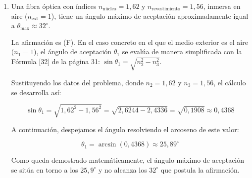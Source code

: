 \documentclass[11pt, a4paper]{article}
\newenvironment{problem}[1][Cuestión]{
	\vspace{0.5cm}
	\noindent{\Large\bfseries #1} \par\vspace{0.5cm}
}{
	\vspace{0.5cm}
}
\begin{document}
\begin{problem}[Cuestión 3]
\begin{enumerate}[label=\alph*)]
		\item Una fibra óptica con índices $n_{\text{núcleo}} = 1,62$ y $n_{\text{revestimiento}} = 1,56$, inmersa en aire ($n_{\text{ext}} = 1$), tiene un ángulo máximo de aceptación aproximadamente igual a $\theta_{\text{max}} \approx 32^\circ$.

			{ \color{blue} 
				La afirmación es  (F). En el caso concreto en el que el medio exterior es el aire ($n_1 = 1$), el ángulo de aceptación $\theta_1$ se evalúa de manera simplificada con la Fórmula [32] de la página 31: $\sin\theta_1 = \sqrt{n_2^2 - n_3^2}$. 

				Sustituyendo los datos del problema, donde $n_2 = 1,62$ y $n_3 = 1,56$, el cálculo se desarrolla así:

				$$
				\sin \theta_1 = \sqrt{1,62^2 - 1,56^2} = \sqrt{2,6244 - 2,4336} = \sqrt{0,1908} \approx 0,4368
				$$

				A continuación, despejamos el ángulo resolviendo el arcoseno de este valor:

				$$
				\theta_1 = \arcsin(0,4368) \approx 25,89^\circ
				$$

				Como queda demostrado matemáticamente, el ángulo máximo de aceptación se sitúa en torno a los $25,9^\circ$ y no alcanza los $32^\circ$ que postula la afirmación.
			}
		\end{enumerate}
	\end{problem}
\end{document}

